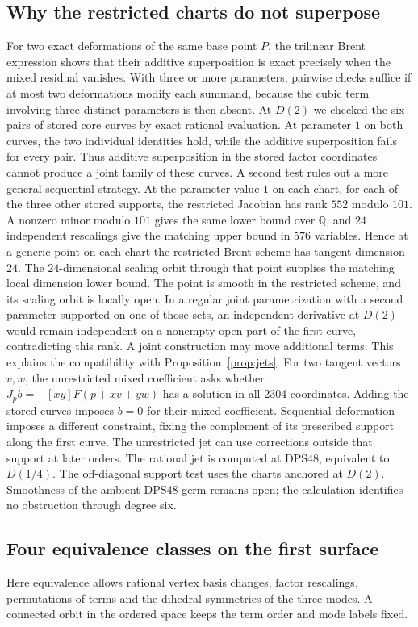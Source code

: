 \documentclass[11pt,reqno]{amsart}
\newcommand{\Q}{\mathbb Q}
\begin{document}
\subsection*{Why the restricted charts do not superpose}
For two exact deformations of the same base point \(P\), the trilinear Brent expression shows that their additive superposition is exact precisely when the mixed residual vanishes. With three or more parameters, pairwise checks suffice if at most two deformations modify each summand, because the cubic term involving three distinct parameters is then absent. At \(D(2)\) we checked the six pairs of stored core curves by exact rational evaluation. At parameter \(1\) on both curves, the two individual identities hold, while the additive superposition fails for every pair. Thus additive superposition in the stored factor coordinates cannot produce a joint family of these curves. A second test rules out a more general sequential strategy. At the parameter value \(1\) on each chart, for each of the three other stored supports, the restricted Jacobian has rank \(552\) modulo \(101\). A nonzero minor modulo \(101\) gives the same lower bound over \(\Q\), and \(24\) independent rescalings give the matching upper bound in \(576\) variables. Hence at a generic point on each chart the restricted Brent scheme has tangent dimension \(24\). The \(24\)-dimensional scaling orbit through that point supplies the matching local dimension lower bound. The point is smooth in the restricted scheme, and its scaling orbit is locally open. In a regular joint parametrization with a second parameter supported on one of those sets, an independent derivative at \(D(2)\) would remain independent on a nonempty open part of the first curve, contradicting this rank. A joint construction may move additional terms. This explains the compatibility with Proposition~\ref{prop:jets}. For two tangent vectors \(v,w\), the unrestricted mixed coefficient asks whether \(J_p b=-[xy]F(p+xv+yw)\) has a solution in all 2304 coordinates. Adding the stored curves imposes \(b=0\) for their mixed coefficient. Sequential deformation imposes a different constraint, fixing the complement of its prescribed support along the first curve. The unrestricted jet can use corrections outside that support at later orders. The rational jet is computed at DPS48, equivalent to \(D(1/4)\). The off-diagonal support test uses the charts anchored at \(D(2)\). Smoothness of the ambient DPS48 germ remains open; the calculation identifies no obstruction through degree six.

\subsection*{Four equivalence classes on the first surface}
Here equivalence allows rational vertex basis changes, factor rescalings, permutations of terms and the dihedral symmetries of the three modes. A connected orbit in the ordered space keeps the term order and mode labels fixed.
\end{document}
